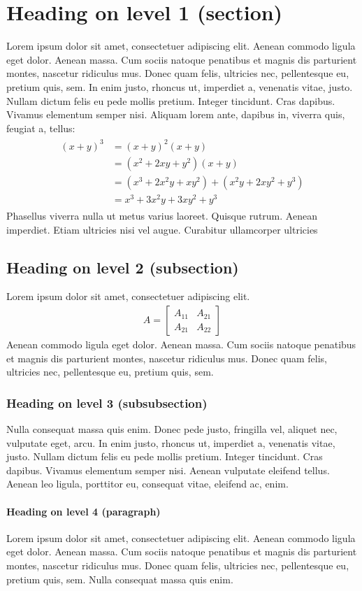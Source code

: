 \section{Heading on level 1 (section)}
Lorem ipsum dolor sit amet, consectetuer adipiscing elit. Aenean commodo ligula eget dolor. Aenean massa. Cum sociis natoque penatibus et magnis dis parturient montes, nascetur ridiculus mus. Donec quam felis, ultricies nec, pellentesque eu, pretium quis, sem. In enim justo, rhoncus ut, imperdiet a, venenatis vitae, justo. Nullam dictum felis eu pede mollis pretium. Integer tincidunt. Cras dapibus. Vivamus elementum semper nisi. Aliquam lorem ante, dapibus in, viverra quis, feugiat a, tellus:
\begin{align}
    \begin{split}
        (x+y)^3 	&= (x+y)^2(x+y)\\
        &=(x^2+2xy+y^2)(x+y)\\
        &=(x^3+2x^2y+xy^2) + (x^2y+2xy^2+y^3)\\
        &=x^3+3x^2y+3xy^2+y^3
    \end{split}
\end{align}
Phasellus viverra nulla ut metus varius laoreet. Quisque rutrum. Aenean imperdiet. Etiam ultricies nisi vel augue. Curabitur ullamcorper ultricies

\subsection{Heading on level 2 (subsection)}
Lorem ipsum dolor sit amet, consectetuer adipiscing elit.
\begin{align}
    A =
    \begin{bmatrix}
        A_{11} & A_{21} \\
        A_{21} & A_{22}
    \end{bmatrix}
\end{align}
Aenean commodo ligula eget dolor. Aenean massa. Cum sociis natoque penatibus et magnis dis parturient montes, nascetur ridiculus mus. Donec quam felis, ultricies nec, pellentesque eu, pretium quis, sem.

\subsubsection{Heading on level 3 (subsubsection)}
Nulla consequat massa quis enim. Donec pede justo, fringilla vel, aliquet nec, vulputate eget, arcu. In enim justo, rhoncus ut, imperdiet a, venenatis vitae, justo. Nullam dictum felis eu pede mollis pretium. Integer tincidunt. Cras dapibus. Vivamus elementum semper nisi. Aenean vulputate eleifend tellus. Aenean leo ligula, porttitor eu, consequat vitae, eleifend ac, enim.

\paragraph{Heading on level 4 (paragraph)}
Lorem ipsum dolor sit amet, consectetuer adipiscing elit. Aenean commodo ligula eget dolor. Aenean massa. Cum sociis natoque penatibus et magnis dis parturient montes, nascetur ridiculus mus. Donec quam felis, ultricies nec, pellentesque eu, pretium quis, sem. Nulla consequat massa quis enim.